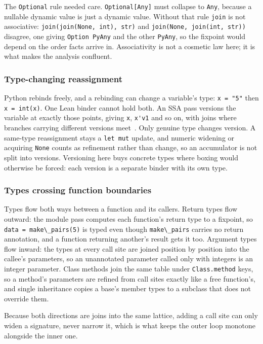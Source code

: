 \documentclass{article}
\newcommand{\code}{\lstinline}
\begin{document}
The \code{Optional} rule needed care. \code{Optional[Any]} must collapse to \code{Any}, because a nullable dynamic value is just a dynamic value. Without that rule \code{join} is not associative: \code{join(join(None, int), str)} and \code{join(None, join(int, str))} disagree, one giving \code{Option PyAny} and the other \code{PyAny}, so the fixpoint would depend on the order facts arrive in. Associativity is not a cosmetic law here; it is what makes the analysis confluent.

\subsubsection{Type-changing reassignment}\label{sec:ssa}

Python rebinds freely, and a rebinding can change a variable's type: \code{x = "5"} then \code{x = int(x)}. One Lean binder cannot hold both. An SSA pass versions the variable at exactly those points, giving \code{x}, \code{x'v1} and so on, with joins where branches carrying different versions meet~\cite{cytron1991ssa}. Only genuine type changes version. A same-type reassignment stays a \code{let mut} update, and numeric widening or acquiring \code{None} counts as refinement rather than change, so an accumulator is not split into versions. Versioning here buys concrete types where boxing would otherwise be forced: each version is a separate binder with its own type.

\subsubsection{Types crossing function boundaries}

Types flow both ways between a function and its callers. Return types flow outward: the module pass computes each function's return type to a fixpoint, so \code{data = make\_pairs(5)} is typed even though \code{make\_pairs} carries no return annotation, and a function returning another's result gets it too. Argument types flow inward: the types at every call site are joined position by position into the callee's parameters, so an unannotated parameter called only with integers is an integer parameter. Class methods join the same table under \code{Class.method} keys, so a method's parameters are refined from call sites exactly like a free function's, and single inheritance copies a base's member types to a subclass that does not override them.

Because both directions are joins into the same lattice, adding a call site can only widen a signature, never narrow it, which is what keeps the outer loop monotone alongside the inner one.
\end{document}
